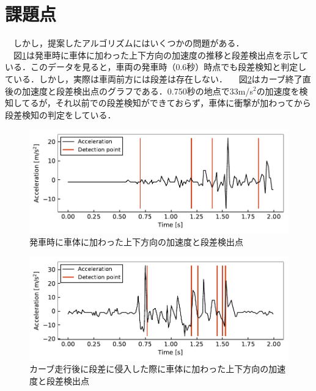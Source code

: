 \section{課題点}
　しかし，提案したアルゴリズムにはいくつかの問題がある．\\
　図\ref{fig:result_acc_departure}は発車時に車体に加わった上下方向の加速度の推移と段差検出点を示している．このデータを見ると，車両の発車時（0.6秒）時点でも段差検知と判定している．しかし，実際は車両前方には段差は存在しない．
　図\ref{fig:result_acc_curve}はカーブ終了直後の加速度と段差検出点のグラフである．0.750秒の地点で33m/s$^2$の加速度を検知してるが，それ以前での段差検知ができておらず，車体に衝撃が加わってから段差検知の判定をしている．

\begin{figure}[H]
    \centering
    \includegraphics[width=13cm]{./fig/result_acc_departure.pdf}
    \caption{発車時に車体に加わった上下方向の加速度と段差検出点}
    \label{fig:result_acc_departure}
\end{figure}

\begin{figure}[H]
    \centering
    \includegraphics[width=13cm]{./fig/result_acc_curve.pdf}
    \caption{カーブ走行後に段差に侵入した際に車体に加わった上下方向の加速度と段差検出点}
    \label{fig:result_acc_curve}
\end{figure}

